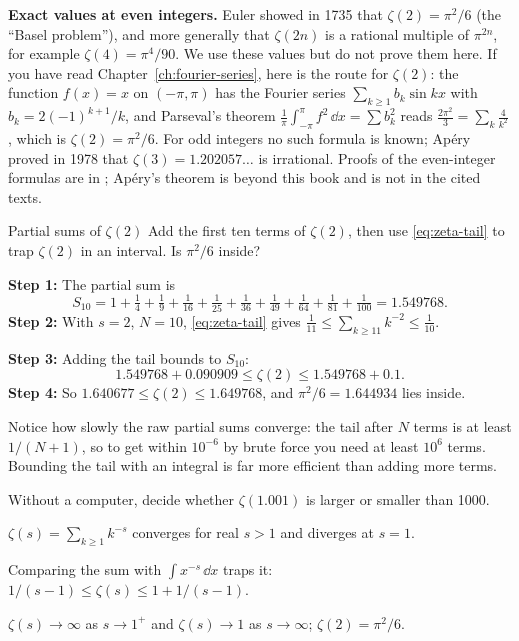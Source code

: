 \begin{beyond}
\textbf{Exact values at even integers.} Euler showed in 1735 that $\zeta(2)=\pi^2/6$ (the ``Basel problem''), and more generally that $\zeta(2n)$ is a rational multiple of $\pi^{2n}$, for example $\zeta(4)=\pi^4/90$. We use these values but do not prove them here. If you have read Chapter~\ref{ch:fourier-series}, here is the route for $\zeta(2)$: the function $f(x)=x$ on $(-\pi,\pi)$ has the Fourier series $\sum_{k\ge1}b_k\sin kx$ with $b_k=2(-1)^{k+1}/k$, and Parseval's theorem $\frac1\pi\int_{-\pi}^{\pi}f^2\,\dd x=\sum b_k^2$ reads $\frac{2\pi^2}{3}=\sum_k\frac{4}{k^2}$, which is $\zeta(2)=\pi^2/6$. For odd integers no such formula is known; Ap\'ery proved in 1978 that $\zeta(3)=1.202057\ldots$ is irrational. Proofs of the even-integer formulas are in \cite{apostol}; Ap\'ery's theorem is beyond this book and is not in the cited texts.
\end{beyond}

\begin{sample}{Partial sums of $\zeta(2)$}
Add the first ten terms of $\zeta(2)$, then use \cref{eq:zeta-tail} to trap $\zeta(2)$ in an interval. Is $\pi^2/6$ inside?

\textbf{Step 1:} The partial sum is
\[
S_{10}=1+\tfrac14+\tfrac19+\tfrac1{16}+\tfrac1{25}+\tfrac1{36}+\tfrac1{49}+\tfrac1{64}+\tfrac1{81}+\tfrac1{100}=1.549768 .
\]
\textbf{Step 2:} With $s=2$, $N=10$, \cref{eq:zeta-tail} gives $\frac{1}{11}\le\sum_{k\ge11}k^{-2}\le\frac1{10}$.

\textbf{Step 3:} Adding the tail bounds to $S_{10}$:
\[
1.549768+0.090909\le\zeta(2)\le1.549768+0.1 .
\]
\textbf{Step 4:} So $\boxed{1.640677\le\zeta(2)\le1.649768}$, and $\pi^2/6=1.644934$ lies inside.

Notice how slowly the raw partial sums converge: the tail after $N$ terms is at least $1/(N+1)$, so to get within $10^{-6}$ by brute force you need at least $10^6$ terms. Bounding the tail with an integral is far more efficient than adding more terms.
\end{sample}

\begin{checkpoint}
Without a computer, decide whether $\zeta(1.001)$ is larger or smaller than 1000.
\end{checkpoint}

\begin{keyideas}
\item $\zeta(s)=\sum_{k\ge1}k^{-s}$ converges for real $s>1$ and diverges at $s=1$.
\item Comparing the sum with $\int x^{-s}\,\dd x$ traps it: $1/(s-1)\le\zeta(s)\le1+1/(s-1)$.
\item $\zeta(s)\to\infty$ as $s\to1^+$ and $\zeta(s)\to1$ as $s\to\infty$; $\zeta(2)=\pi^2/6$.
\end{keyideas}

